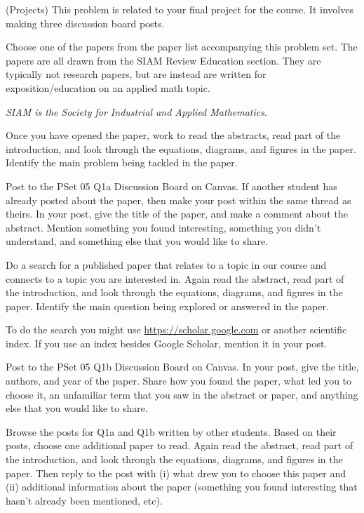 \documentclass[12pt,letterpaper,noanswers]{exam}
\begin{document}
\begin{questions}
\question (Projects) This problem is related to your final project for the course.  It involves making three discussion board posts.


\begin{parts}
\item Choose one of the papers from the paper list accompanying this problem set.  The papers are all drawn from the SIAM Review Education section.  They are typically not research papers, but are instead are written for exposition/education on an applied math topic.

\emph{SIAM is the Society for Industrial and Applied Mathematics}.
    
    
Once you have opened the paper, work to read the abstracts, read part of the introduction, and look through the equations, diagrams, and figures in the paper.  Identify the main problem being tackled in the paper.


Post to the PSet 05 Q1a Discussion Board on Canvas.  If another student has already posted about the paper, then make your post within the same thread as theirs.  In your post, give the title of the paper, and make a comment about the abstract.  Mention something you found interesting, something you didn't understand, and something else that you would like to share.


\item Do a search for a published paper that relates to a topic in our course and connects to a topic you are interested in.  Again read the abstract, read part of the introduction, and look through the equations, diagrams, and figures in the paper.  Identify the main question being explored or answered in the paper.

To do the search you might use \url{https://scholar.google.com} or another scientific index.  If you use an index besides Google Scholar, mention it in your post.    
    

Post to the PSet 05 Q1b Discussion Board on Canvas.  In your post, give the title, authors, and year of the paper.  Share how you found the paper, what led you to choose it, an unfamiliar term that you saw in the abstract or paper, and anything else that you would like to share.

\item Browse the posts for Q1a and Q1b written by other students.  Based on their posts, choose one additional paper to read.  Again read the abstract, read part of the introduction, and look through the equations, diagrams, and figures in the paper.  Then reply to the post with (i) what drew you to choose this paper and (ii) additional information about the paper (something you found interesting that hasn't already been mentioned, etc).


\end{parts}
\end{questions}
\end{document}
